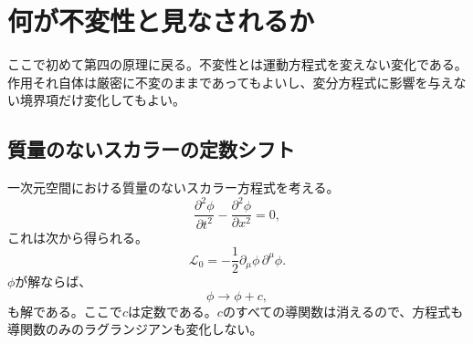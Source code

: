 \begin{classroomqa}
\end{classroomqa}

\begin{classroomqa}
\end{classroomqa}

\section{何が不変性と見なされるか}

ここで初めて第四の原理に戻る。不変性とは運動方程式を変えない変化である。作用それ自体は厳密に不変のままであってもよいし、変分方程式に影響を与えない境界項だけ変化してもよい。

\subsection{質量のないスカラーの定数シフト}

一次元空間における質量のないスカラー方程式を考える。
\begin{equation}
\frac{\partial^2\phi}{\partial t^2}
-\frac{\partial^2\phi}{\partial x^2}
=0,
\label{eq:sr7-wave}
\end{equation}
これは次から得られる。
\begin{equation}
\mathcal L_0
=
-\frac12\partial_\mu\phi\,\partial^\mu\phi.
\label{eq:sr7-massless-L}
\end{equation}
\(\phi\)が解ならば、
\begin{equation}
\phi\longrightarrow\phi+c,
\label{eq:sr7-constant-shift}
\end{equation}
も解である。ここで\(c\)は定数である。\(c\)のすべての導関数は消えるので、方程式も導関数のみのラグランジアンも変化しない。

